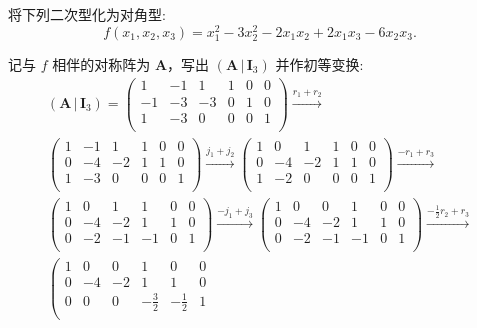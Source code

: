 \documentclass[../../main.tex]{subfiles}%
\begin{document}
\begin{example}\label{example:二次型化简-初等变换法例题1}
将下列二次型化为对角型:
\[
f(x_1,x_2,x_3)=x_1^2 - 3x_2^2 - 2x_1x_2 + 2x_1x_3 - 6x_2x_3.
\]
\end{example}
\begin{solution}

记与 $f$ 相伴的对称阵为 $\boldsymbol{A}$，写出 $(\boldsymbol{A}\,|\,\boldsymbol{I}_3)$ 并作初等变换:
\begin{gather*}
\left( \boldsymbol{A}\,|\,\boldsymbol{I}_3 \right) =\left( \begin{matrix}
1&		-1&		1&		1&		0&		0\\
-1&		-3&		-3&		0&		1&		0\\
1&		-3&		0&		0&		0&		1\\
\end{matrix} \right) \xrightarrow{r_1+r_2}
\\
\left( \begin{matrix}
1&		-1&		1&		1&		0&		0\\
0&		-4&		-2&		1&		1&		0\\
1&		-3&		0&		0&		0&		1\\
\end{matrix} \right) \xrightarrow{j_1+j_2}\left( \begin{matrix}
1&		0&		1&		1&		0&		0\\
0&		-4&		-2&		1&		1&		0\\
1&		-2&		0&		0&		0&		1\\
\end{matrix} \right) \xrightarrow{-r_1+r_3}
\\
\left( \begin{matrix}
1&		0&		1&		1&		0&		0\\
0&		-4&		-2&		1&		1&		0\\
0&		-2&		-1&		-1&		0&		1\\
\end{matrix} \right) \xrightarrow{-j_1+j_3}\left( \begin{matrix}
1&		0&		0&		1&		0&		0\\
0&		-4&		-2&		1&		1&		0\\
0&		-2&		-1&		-1&		0&		1\\
\end{matrix} \right) \xrightarrow{-\frac{1}{2}r_2+r_3}
\\
\left( \begin{matrix}
1&		0&		0&		1&		0&		0\\
0&		-4&		-2&		1&		1&		0\\
0&		0&		0&		-\frac{3}{2}&		-\frac{1}{2}&		1\\

\end{matrix}
\end{gather*}
\end{solution}
\end{document}
